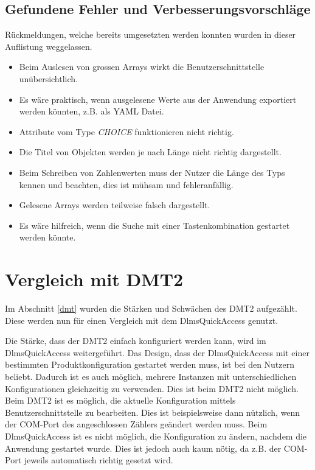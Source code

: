 \subsection{Gefundene Fehler und Verbesserungsvorschläge}\label{gefundeneFehler}
Rückmeldungen, welche bereits umgesetzten werden konnten wurden in dieser Auflistung weggelassen.
\begin{itemize}
   \item Beim Auslesen von grossen Arrays wirkt die Benutzerschnittstelle unübersichtlich.
   \item Es wäre praktisch, wenn ausgelesene Werte aus der Anwendung exportiert werden könnten, z.B. als \ac{YAML} Datei.
   \item Attribute vom Type \textit{CHOICE} funktionieren nicht richtig.
   \item Die Titel von Objekten werden je nach Länge nicht richtig dargestellt.
   \item Beim Schreiben von Zahlenwerten muss der Nutzer die Länge des Typs kennen und beachten, dies ist mühsam und fehleranfällig.
   \item Gelesene Arrays werden teilweise falsch dargestellt.
   \item Es wäre hilfreich, wenn die Suche mit einer Tastenkombination gestartet werden könnte.
\end{itemize}

\section{Vergleich mit DMT2}
Im Abschnitt \ref{dmt} wurden die Stärken und Schwächen des \ac{DMT2} aufgezählt.
Diese werden nun für einen Vergleich mit dem DlmsQuickAccess genutzt.

Die Stärke, dass der \ac{DMT2} einfach konfiguriert werden kann, wird im DlmsQuickAccess weitergeführt.
Das Design, dass der DlmsQuickAccess mit einer bestimmten Produktkonfiguration gestartet werden muss, ist bei den Nutzern beliebt.
Dadurch ist es auch möglich, mehrere Instanzen mit unterschiedlichen Konfigurationen gleichzeitig zu verwenden.
Dies ist beim \ac{DMT2} nicht möglich.
Beim \ac{DMT2} ist es möglich, die aktuelle Konfiguration mittels Benutzerschnittstelle zu bearbeiten.
Dies ist beispielsweise dann nützlich, wenn der COM-Port des angeschlossen Zählers geändert werden muss.
Beim DlmsQuickAccess ist es nicht möglich, die Konfiguration zu ändern, nachdem die Anwendung gestartet wurde.
Dies ist jedoch auch kaum nötig, da z.B. der COM-Port jeweils automatisch richtig gesetzt wird.


